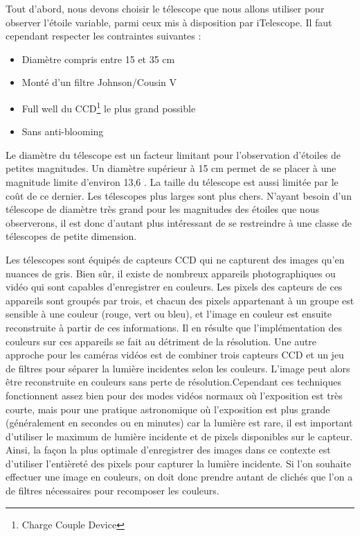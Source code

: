 \documentclass[10pt,french, openany]{book}
\begin{document}
    Tout d'abord, nous devons choisir le télescope que nous allons utiliser pour observer l'étoile variable, parmi ceux mis à disposition par iTelescope. Il faut cependant respecter les contraintes suivantes :
    
    \begin{itemize}
        \item Diamètre compris entre 15 et 35 cm
        \item Monté d'un filtre Johnson/Cousin V
        \item Full well du CCD\footnote{Charge Couple Device} le plus grand possible
        \item Sans anti-blooming
    \end{itemize}
    
    Le diamètre du télescope est un facteur limitant pour l'observation d'étoiles de petites magnitudes. Un diamètre supérieur à 15 cm permet de se placer à une magnitude limite d'environ 13,6 \cite{Griffiths0}. La taille du télescope est aussi limitée par le coût de ce dernier. Les télescopes plus larges sont plus chers. N'ayant besoin d'un télescope de diamètre très grand pour les magnitudes des étoiles que nous observerons, il est donc d'autant plus intéressant de se restreindre à une classe de télescopes de petite dimension.
    
    Les télescopes sont équipés de capteurs CCD qui ne capturent des images qu'en nuances de gris. Bien sûr, il existe de nombreux appareils photographiques ou vidéo qui sont capables d'enregistrer en couleurs. Les pixels des capteurs de ces appareils sont groupés par trois, et chacun des pixels appartenant à un groupe est sensible à une couleur (rouge, vert ou bleu), et l'image en couleur est ensuite reconstruite à partir de ces informations. Il en résulte que l'implémentation des couleurs sur ces appareils se fait au détriment de la résolution. Une autre approche pour les caméras vidéos est de combiner trois capteurs CCD et un jeu de filtres pour séparer la lumière incidentes selon les couleurs. L'image peut alors être reconstruite en couleurs sans perte de résolution.Cependant ces techniques fonctionnent assez bien pour des modes vidéos normaux où l'exposition est très courte, mais pour une pratique astronomique où l'exposition est plus grande (généralement en secondes ou en minutes) car la lumière est rare, il est important d'utiliser le maximum de lumière incidente et de pixels disponibles sur le capteur.
    Ainsi, la façon la plus optimale d'enregistrer des images dans ce contexte est d'utiliser l'entièreté des pixels pour capturer la lumière incidente. Si l'on souhaite effectuer une image en couleurs, on doit donc prendre autant de clichés que l'on a de filtres nécessaires pour recomposer les couleurs.\cite{Griffiths0, manual:sbig}
   
\end{document}
